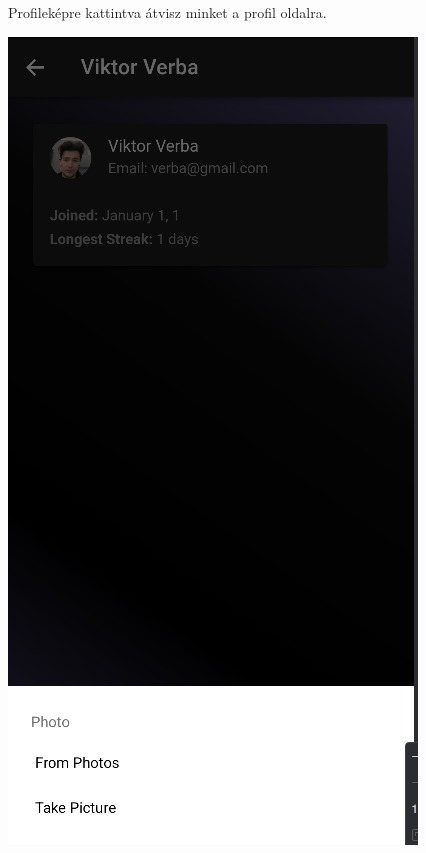 \documentclass[12pt]{report}
\begin{document}
\begin{figure}[H]
\begin{minipage}[b]{0.3\textwidth}
        \par
        \footnotesize Profileképre kattintva átvisz minket a profil oldalra. 
    \end{minipage}
    \hfill
    \begin{minipage}[b]{0.3\textwidth}
        \centering
        \includegraphics[width=\linewidth]{src/profilepic1.png}

\end{minipage}
\end{figure}
\end{document}

